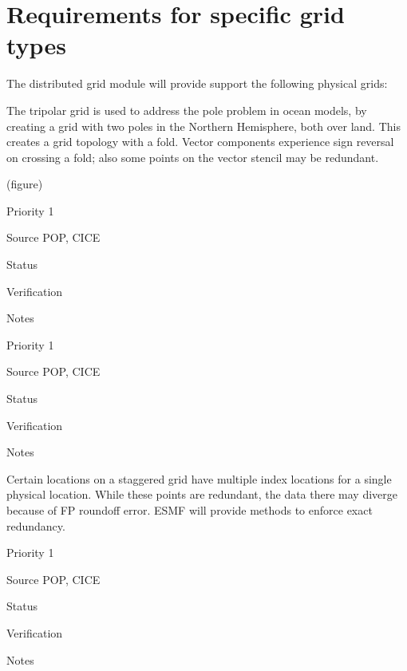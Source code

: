 \part{Requirements for specific grid types} \label{DG:gridtypes}

The distributed grid module will provide support the following 
physical grids:


The tripolar grid \cite{ref:m1996} is used to address the pole problem
in ocean models, by creating a grid with two poles in the Northern
Hemisphere, both over land. This creates a grid topology with a
fold. Vector components experience sign reversal on crossing a fold;
also some points on the vector stencil may be redundant.

(figure)

\begin{reqlist}
\item[Priority] 1
\item[Source] POP, CICE
\item[Status]
\item[Verification]
\item[Notes]
\end{reqlist}


\begin{reqlist}
\item[Priority] 1
\item[Source] POP, CICE
\item[Status]
\item[Verification]
\item[Notes]
\end{reqlist}


Certain locations on a staggered grid have multiple index locations
for a single physical location. While these points are redundant, the
data there may diverge because of FP roundoff error. ESMF will provide
methods to enforce exact redundancy.

\begin{reqlist}
\item[Priority] 1
\item[Source] POP, CICE
\item[Status]
\item[Verification]
\item[Notes]
\end{reqlist}

